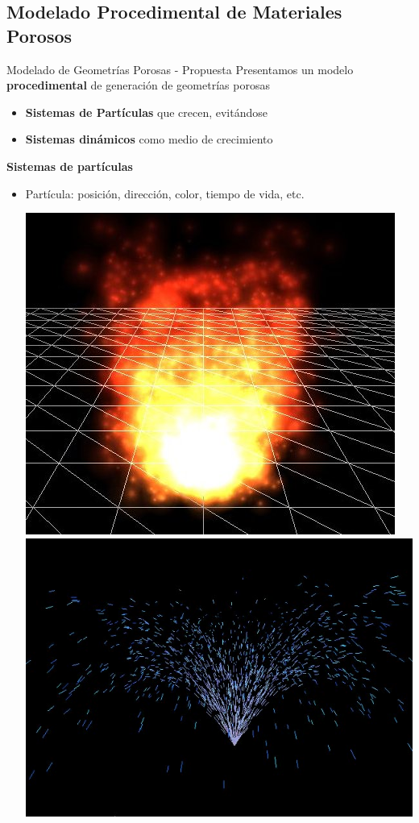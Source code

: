 \documentclass[spanish,unknownkeysallowed,10pt]{beamer}
\begin{document}
\subsection{Modelado Procedimental de Materiales Porosos}
\begin{frame}{Modelado de Geometrías Porosas - Propuesta}
Presentamos un modelo \textbf{procedimental} de generación de geometrías porosas
\begin{itemize}
\item \textbf{Sistemas de Partículas} que crecen, evitándose
\item \textbf{Sistemas dinámicos} como medio de crecimiento
\end{itemize}

\vspace{0.4cm}

\textbf{Sistemas de partículas}
\begin{itemize}
\item Partícula: posición, dirección, color, tiempo de vida, etc.

\includegraphics[scale = 0.216]{../figures/fire}
\includegraphics[scale = 0.2]{../figures/fireworks}
\end{itemize}
\end{frame}
\end{document}
